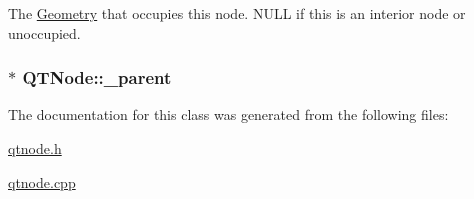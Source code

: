 The \hyperlink{class_geometry}{Geometry} that occupies this node. N\+U\+L\+L if this is an interior node or unoccupied. \hypertarget{class_q_t_node_a47f01353c3e4f66ab1006a7dbc2be797}{
\subsubsection[{\+\_\+parent}]{$\ast$ Q\+T\+Node\+::\+\_\+parent}}\label{class_q_t_node_a47f01353c3e4f66ab1006a7dbc2be797}


The documentation for this class was generated from the following files\+:\begin{DoxyCompactItemize}
\item 
\hyperlink{qtnode_8h}{qtnode.\+h}\item 
\hyperlink{qtnode_8cpp}{qtnode.\+cpp}\end{DoxyCompactItemize}
